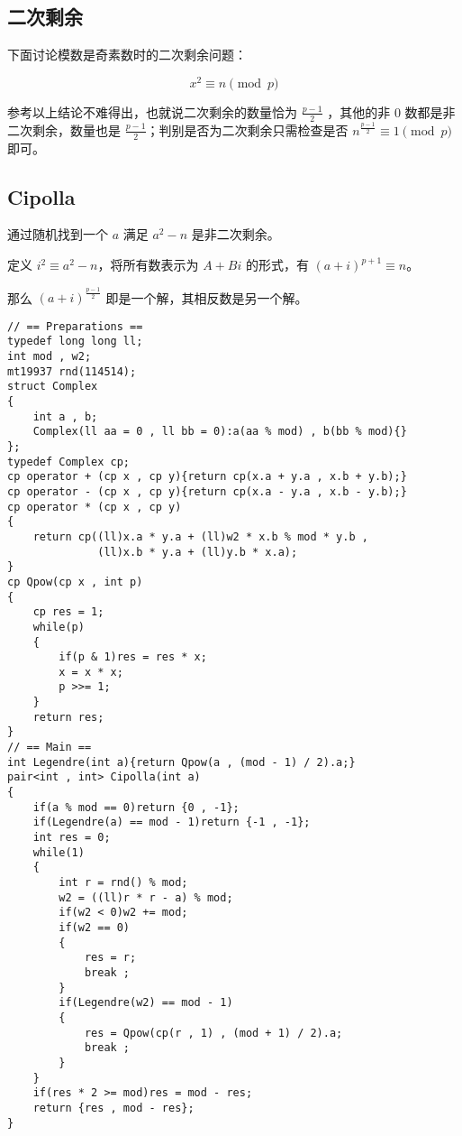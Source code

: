 \subsection{二次剩余}

下面讨论模数是奇素数时的二次剩余问题：

$$x^2 \equiv n \pmod p$$

参考以上结论不难得出，也就说二次剩余的数量恰为 $\frac{p-1}{2}$ ，其他的非 $0$ 数都是非二次剩余，数量也是 $\frac{p-1}{2}$；判别是否为二次剩余只需检查是否 $n^{\frac{p-1}{2}} \equiv 1 \pmod p$ 即可。

\subsection{Cipolla}

通过随机找到一个 $a$ 满足 $a^2 - n$ 是非二次剩余。

定义 $i^2\equiv a^2 - n$，将所有数表示为 $A+Bi$ 的形式，有 $(a+i)^{p+1}\equiv n$。

那么 $(a+i)^{\frac{p-1}{2}}$ 即是一个解，其相反数是另一个解。

\begin{verbatim}
// == Preparations ==
typedef long long ll;
int mod , w2;
mt19937 rnd(114514);
struct Complex
{
    int a , b;
    Complex(ll aa = 0 , ll bb = 0):a(aa % mod) , b(bb % mod){}
};
typedef Complex cp;
cp operator + (cp x , cp y){return cp(x.a + y.a , x.b + y.b);}
cp operator - (cp x , cp y){return cp(x.a - y.a , x.b - y.b);}
cp operator * (cp x , cp y)
{
    return cp((ll)x.a * y.a + (ll)w2 * x.b % mod * y.b ,
              (ll)x.b * y.a + (ll)y.b * x.a);
}
cp Qpow(cp x , int p)
{
    cp res = 1;
    while(p)
    {
        if(p & 1)res = res * x;
        x = x * x;
        p >>= 1;
    }
    return res;
}
// == Main ==
int Legendre(int a){return Qpow(a , (mod - 1) / 2).a;}
pair<int , int> Cipolla(int a)
{
    if(a % mod == 0)return {0 , -1};
    if(Legendre(a) == mod - 1)return {-1 , -1};
    int res = 0;
    while(1)
    {
        int r = rnd() % mod;
        w2 = ((ll)r * r - a) % mod;
        if(w2 < 0)w2 += mod;
        if(w2 == 0)
        {
            res = r;
            break ;
        }
        if(Legendre(w2) == mod - 1)
        {
            res = Qpow(cp(r , 1) , (mod + 1) / 2).a;
            break ;
        }
    }
    if(res * 2 >= mod)res = mod - res;
    return {res , mod - res};
}
\end{verbatim}